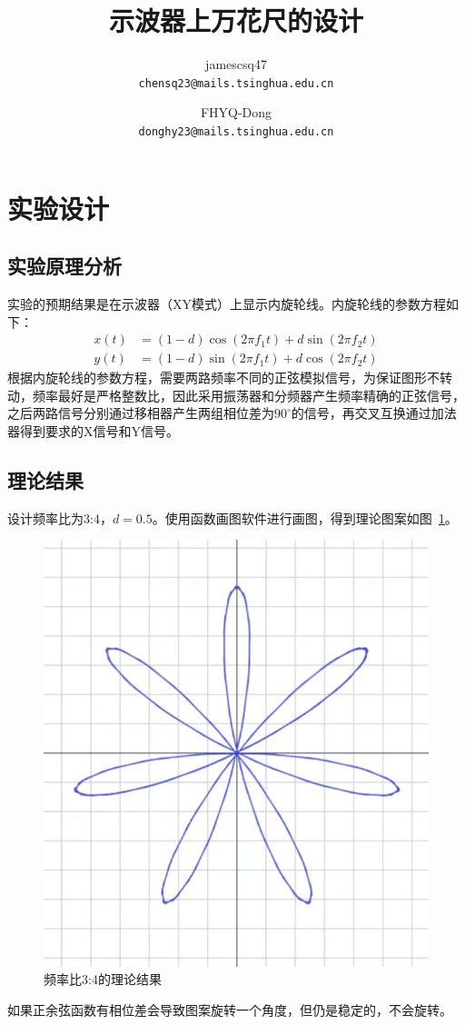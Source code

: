 \documentclass[utf8,twocolumn]{article}
\title{示波器上万花尺的设计}
\author{
    jamescsq47 \\
    \texttt{chensq23@mails.tsinghua.edu.cn}
\and
    FHYQ-Dong \\
    \texttt{donghy23@mails.tsinghua.edu.cn}
}
\date{\zhtoday}
\begin{document}
\maketitle
\thispagestyle{fancy}



\section{实验设计}
\subsection{实验原理分析}
实验的预期结果是在示波器（XY模式）上显示内旋轮线。内旋轮线的参数方程如下：
\begin{equation}
\begin{aligned}
    x\left(t\right) &= \left(1 - d\right) \cos\left(2\pi f_1 t\right) + d \sin\left(2\pi f_2 t\right) \\
    y\left(t\right) &= \left(1 - d\right) \sin\left(2\pi f_1 t\right) + d \cos\left(2\pi f_2 t\right)
\end{aligned}
\end{equation}
根据内旋轮线的参数方程，需要两路频率不同的正弦模拟信号，为保证图形不转动，频率最好是严格整数比，因此采用振荡器和分频器产生频率精确的正弦信号，之后两路信号分别通过移相器产生两组相位差为$90^\circ$的信号，再交叉互换通过加法器得到要求的X信号和Y信号。


\subsection{理论结果}
设计频率比为3:4，$ d = 0.5 $。使用函数画图软件进行画图，得到理论图案如图~\ref{plot:theory_plot}。
\begin{figure}[H]
    \centering
    \includegraphics[width=0.6\linewidth]{images/baseline.jpg}
    \caption{频率比3:4的理论结果}
    \label{plot:theory_plot}
\end{figure}
如果正余弦函数有相位差会导致图案旋转一个角度，但仍是稳定的，不会旋转。
\end{document}

